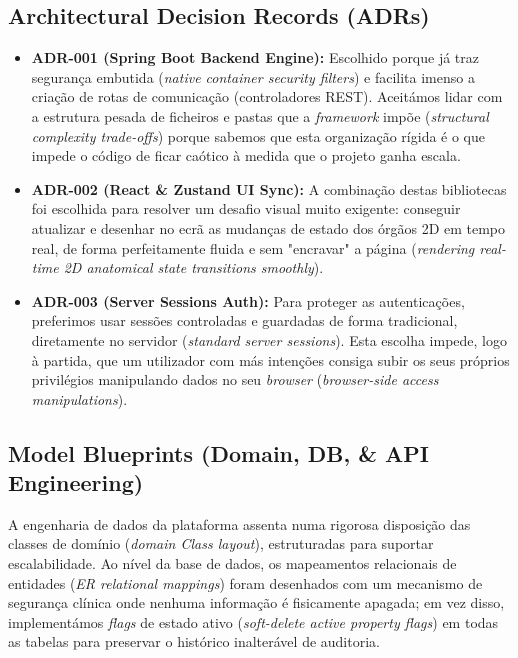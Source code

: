 \documentclass[11pt,a4paper]{article}
\begin{document}
\subsection{Architectural Decision Records (ADRs)}
\begin{itemize}[label=\color{accentblue}\bullet]
    \item \textbf{\textnormal{ADR-001} (Spring Boot Backend Engine):} Escolhido porque já traz segurança embutida (\textit{native container security filters}) e facilita imenso a criação de rotas de comunicação (controladores REST). Aceitámos lidar com a estrutura pesada de ficheiros e pastas que a \textit{framework} impõe (\textit{structural complexity trade-offs}) porque sabemos que esta organização rígida é o que impede o código de ficar caótico à medida que o projeto ganha escala.
    \item \textbf{\textnormal{ADR-002} (React \& Zustand UI Sync):} A combinação destas bibliotecas foi escolhida para resolver um desafio visual muito exigente: conseguir atualizar e desenhar no ecrã as mudanças de estado dos órgãos 2D em tempo real, de forma perfeitamente fluida e sem "encravar" a página (\textit{rendering real-time 2D anatomical state transitions smoothly}).
    \item \textbf{\textnormal{ADR-003} (Server Sessions Auth):} Para proteger as autenticações, preferimos usar sessões controladas e guardadas de forma tradicional, diretamente no servidor (\textit{standard server sessions}). Esta escolha impede, logo à partida, que um utilizador com más intenções consiga subir os seus próprios privilégios manipulando dados no seu \textit{browser} (\textit{browser-side access manipulations}).
\end{itemize}

\subsection{Model Blueprints (Domain, DB, \& API Engineering)}
A engenharia de dados da plataforma assenta numa rigorosa disposição das classes de domínio (\textit{domain Class layout}), estruturadas para suportar escalabilidade. Ao nível da base de dados, os mapeamentos relacionais de entidades (\textit{ER relational mappings}) foram desenhados com um mecanismo de segurança clínica onde nenhuma informação é fisicamente apagada; em vez disso, implementámos \textit{flags} de estado ativo (\textit{soft-delete active property flags}) em todas as tabelas para preservar o histórico inalterável de auditoria. 
\end{document}
